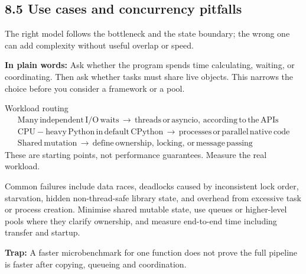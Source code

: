 \documentclass[11pt]{article}
\begin{document}
\begin{keepsection}
\section{8.5 Use cases and concurrency pitfalls}

The right model follows the bottleneck and the state boundary; the wrong one can add complexity without useful overlap or speed.

\begin{plainbox}\textbf{In plain words:} Ask whether the program spends time calculating, waiting, or coordinating. Then ask whether tasks must share live objects. This narrows the choice before you consider a framework or a pool.\end{plainbox}

\begin{equationcard}{Workload routing}
\[ \begin{gathered} \text{Many}\, \text{independent}\, \mathrm{I}/\mathrm{O}\, \text{waits}\, \to \, \text{threads}\, \text{or}\, \text{asyncio},\, \text{according}\, \text{to}\, \text{the}\, \text{APIs} \\ \text{CPU}-\text{heavy}\, \text{Python}\, \text{in}\, \text{default}\, \text{CPython}\, \to \, \text{processes}\, \text{or}\, \text{parallel}\, \text{native}\, \text{code} \\ \text{Shared}\, \text{mutation}\, \to \, \text{define}\, \text{ownership},\, \text{locking},\, \text{or}\, \text{message}\, \text{passing} \end{gathered} \]
{\small These are starting points, not performance guarantees. Measure the real workload.}
\end{equationcard}

Common failures include data races, deadlocks caused by inconsistent lock order, starvation, hidden non-thread-safe library state, and overhead from excessive task or process creation. Minimise shared mutable state, use queues or higher-level pools where they clarify ownership, and measure end-to-end time including transfer and startup.

\begin{notebox}\textbf{Trap:} A faster microbenchmark for one function does not prove the full pipeline is faster after copying, queueing and coordination.\end{notebox}


\end{keepsection}
\end{document}

